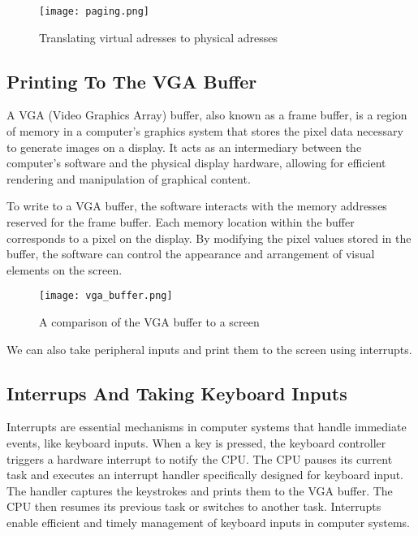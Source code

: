\documentclass[12pt, letterpaper]{article}
\begin{document}
\begin{figure} [H]
      \centering
      \texttt{[image: paging.png]}
      \caption{Translating virtual adresses to physical adresses}
      \label{fig:paging}
\end{figure}

\newpage

\subsection{Printing To The VGA Buffer}
A VGA (Video Graphics Array) buffer, also known as a frame buffer, is a region of memory in a computer's graphics 
system that stores the pixel data necessary to generate images on a display. It acts as an intermediary between the 
computer's software and the physical display hardware, allowing for efficient rendering and manipulation of graphical 
content.

To write to a VGA buffer, the software interacts with the memory addresses reserved for the frame buffer. Each 
memory location within the buffer corresponds to a pixel on the display. By modifying the pixel values stored in 
the buffer, the software can control the appearance and arrangement of visual elements on the screen.

\begin{figure}[H]
      \centering
      \texttt{[image: vga\_buffer.png]}
      \caption{A comparison of the VGA buffer to a screen}
      \label{fig:vga_buffer}
\end{figure}

We can also take peripheral inputs and print them to the screen using interrupts.

\subsection{Interrups And Taking Keyboard Inputs}

Interrupts are essential mechanisms in computer systems that handle immediate events, like keyboard inputs. 
When a key is pressed, the keyboard controller triggers a hardware interrupt to notify the CPU. The CPU pauses 
its current task and executes an interrupt handler specifically designed for keyboard input. The handler 
captures the keystrokes and prints them to the VGA buffer. The CPU then resumes its previous task or switches 
to another task. Interrupts enable efficient and timely management of keyboard inputs in computer systems.
\end{document}
